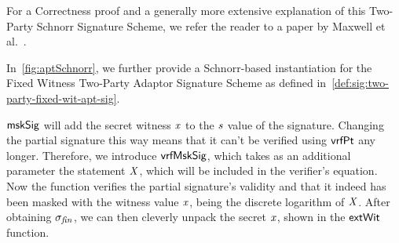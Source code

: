 For a Correctness proof and a generally more extensive explanation of this Two-Party Schnorr Signature Scheme, we refer the reader to a paper by Maxwell et al.~\cite{maxwell2019simple}.

In~\cref{fig:aptSchnorr}, we further provide a Schnorr-based instantiation for the Fixed Witness Two-Party Adaptor Signature Scheme as defined in~\cref{def:sig:two-party-fixed-wit-apt-sig}.

$\mathsf{mskSig}$ will add the secret witness $\mathit{x}$ to the $\mathit{s}$ value of the signature.
Changing the partial signature this way means that it can't be verified using $\mathsf{vrfPt}$ any longer.
Therefore, we introduce $\mathsf{vrfMskSig}$, which takes as an additional parameter the statement $\mathit{X}$, which will be included in the verifier's equation.
Now the function verifies the partial signature's validity and that it indeed has been masked with the witness value $\mathit{x}$, being the discrete logarithm of $\mathit{X}$.
After obtaining $\sigma_{\mathit{fin}}$, we can then cleverly unpack the secret $\mathit{x}$, shown in the $\mathsf{extWit}$ function.

